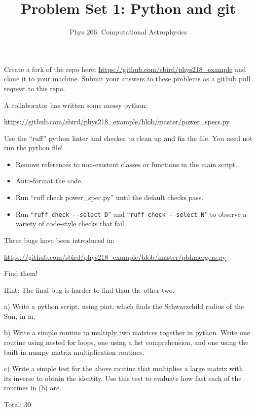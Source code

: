 \documentclass[10pt]{article}
\newenvironment{problem}[2][Problem]{\begin{trivlist}
\item[\hskip \labelsep {\bfseries #1}\hskip \labelsep {\bfseries #2}]}{\end{trivlist}}
\begin{document}
\title{Problem Set 1: Python and git}
\author{Phys 206: Computational Astrophysics}
\maketitle

\begin{problem}{1.0 Github (4)}
Create a fork of the repo here: \url{https://github.com/sbird/phys218_example}
 and clone it to your machine. Submit your answers to these problems as a github pull request to this repo.
\end{problem}

\begin{problem}{1.1 Cleanups (10)}
A collaborator has written some messy python:

\url{https://github.com/sbird/phys218_example/blob/master/power_specs.py}

Use the ``ruff'' python linter and checker to clean up and fix the file. You need not run the python file!
\begin{itemize}
 \item Remove references to non-existent classes or functions in the main script.
\item Auto-format the code.
\item Run ``ruff check power\_spec.py'' until the default checks pass.
\item Run ``\verb|ruff check --select D|'' and ``\verb|ruff check --select N|'' to observe a variety of code-style checks that fail.
\end{itemize}
\end{problem}

\begin{problem}{1.2 Find the bug (6)}
Three bugs have been introduced in:

\url{https://github.com/sbird/phys218_example/blob/master/pbhmergers.py}

Find them!

Hint: The final bug is harder to find than the other two.
\end{problem}

\begin{problem}{1.3 Writing python (10)}

a) Write a python script, using pint, which finds the Schwarzchild radius of the Sun, in m.

b) Write a simple routine to multiply two matrices together in python. Write one routine using nested for loops, one using a list comprehension, and one using the built-in numpy matrix multiplication routines.

c) Write a simple test for the above routine that multiplies a large matrix with its inverse to obtain the identity. Use this test to evaluate how fast each of the routines in (b) are.
\end{problem}

Total: 30
\end{document}
